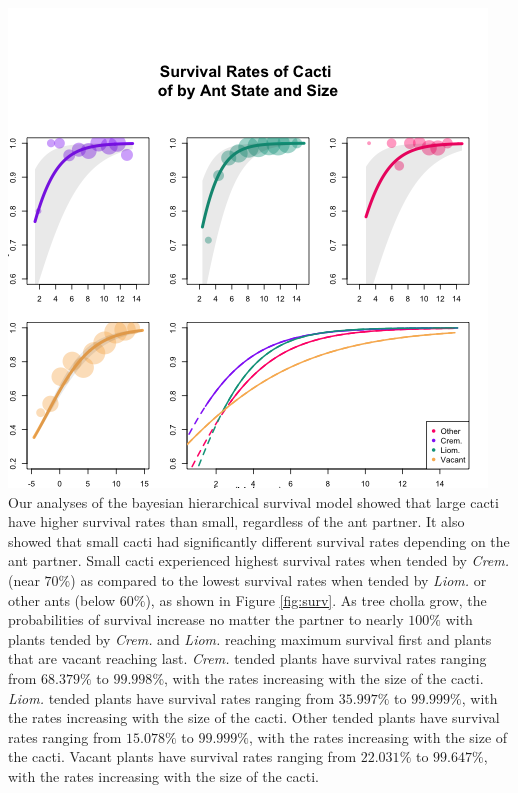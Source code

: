 \documentclass[12pt,a4paper]{article}
\begin{document}
{{\includegraphics{"Figures/surv_panels_cropped.png"}
Our analyses of the bayesian hierarchical survival model showed that large cacti have higher survival rates than small, regardless of the ant partner. 
It also showed that small cacti had significantly different survival rates depending on the ant partner. 
Small cacti experienced highest survival rates when tended by \textit{Crem.} (near $70\%$) as compared to the lowest survival rates when tended by \textit{Liom.} or other ants (below $60\%$), as shown in Figure \ref{fig:surv}.
As tree cholla grow, the probabilities of survival increase no matter the partner to nearly $100\%$ with plants tended by \textit{Crem.} and \textit{Liom.} reaching maximum survival first and plants that are vacant reaching last. 
\textit{Crem.} tended plants have survival rates ranging from $68.379\%$ to $99.998\%$, with the rates increasing with the size of the cacti.  
\textit{Liom.} tended plants have survival rates ranging from $35.997\%$ to $99.999\%$, with the rates increasing with the size of the cacti. 
Other tended plants have survival rates ranging from $15.078\%$ to $99.999\%$, with the rates increasing with the size of the cacti. 
Vacant plants have survival rates ranging from $22.031\%$ to $99.647\%$, with the rates increasing with the size of the cacti. 

}}
\end{document}
